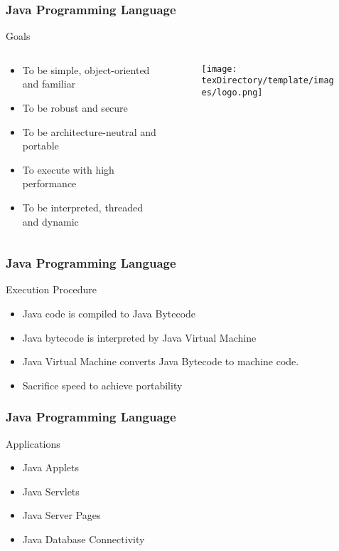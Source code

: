 \documentclass[10pt, compress]{beamer}
\begin{document}
\begin{frame}[fragile]
	\frametitle{Java Programming Language}
	\begin{block}{Goals}
		\begin{columns}
			\begin{column}{0.7\textwidth}
			\begin{itemize}
				\item[] To be simple, object-oriented and familiar
				\item[] To be robust and secure
				\item[] To be architecture-neutral and portable
				\item[] To execute with high performance
				\item[] To be interpreted, threaded and dynamic
			\end{itemize}
			\end{column}
			\begin{column}{0.3\textwidth}
			\begin{figure}
				\texttt{[image: \\texDirectory/template/images/logo.png]}
			\end{figure}
			\end{column}
		\end{columns}
	\end{block}
\end{frame}

\begin{frame}[fragile]
	\frametitle{Java Programming Language}
	\begin{block}{Execution Procedure}
		\begin{itemize}
			\item[] Java code is compiled to Java Bytecode
			\item[] Java bytecode is interpreted by Java Virtual Machine
			\item[] Java Virtual Machine converts Java Bytecode to machine code.
			\item[] Sacrifice speed to achieve portability
		\end{itemize}
	\end{block}
\end{frame}

\begin{frame}[fragile]
	\frametitle{Java Programming Language}
	\begin{block}{Applications}
		\begin{itemize}
			\item[] Java Applets
			\item[] Java Servlets
			\item[] Java Server Pages
			\item[] Java Database Connectivity
		\end{itemize}
	\end{block}
\end{frame}
\end{document}
